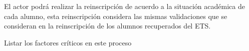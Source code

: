\begin{PDescripcion}
\begin{enumerate}
		\Ppaso[\PSubProceso]  El actor podrá realizar la reinscripción de acuerdo a la situación académica de cada alumno, esta reinscripción considera las mismas validaciones que se consideran en la reinscripción de los alumnos recuperados del ETS.
		
		
		
	\end{enumerate}
\end{PDescripcion}


\begin{FCDescripcion}
	\FCpaso Listar los factores críticos en este proceso
\end{FCDescripcion}